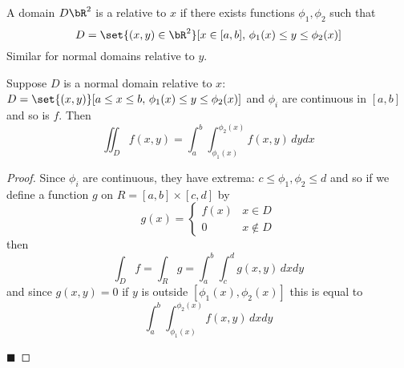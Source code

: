 \documentclass[10pt]{article}
\begin{document}
\begin{defn*}

    A domain $D\bR^2$ is a  relative to $x$ if there exists functions $\phi_1,\phi_2$ such that
    \[ D = \set{(x,y)\in\bR^2}[x\in[a,b],\, \phi_1(x)\leq y\leq\phi_2(x)] \]
    Similar for normal domains relative to $y$.

\end{defn*}

\begin{prop*}

    Suppose $D$ is a normal domain relative to $x$: $D=\set{(x,y)}[a\leq x\leq b,\, \phi_1(x)\leq y\leq\phi_2(x)]$ and $\phi_i$ are continuous in $[a,b]$ and so is $f$.
    Then
    \[ \iint_D f(x,y) = \int_a^b\int_{\phi_1(x)}^{\phi_2(x)}f(x,y)\,dydx \]

\end{prop*}

\begin{proof}

    Since $\phi_i$ are continuous, they have extrema: $c\leq\phi_1,\phi_2\leq d$ and so if we define a function $g$ on $R=[a,b]\times[c,d]$ by
    \[ g(x) = \begin{cases} f(x) & x\in D \\ 0 & x\notin D \end{cases} \]
    then
    \[ \int_D f = \int_R g = \int_a^b \int_c^d g(x,y)\,dxdy \]
    and since $g(x,y)=0$ if $y$ is outside $[\phi_1(x),\phi_2(x)]$ this is equal to
    \[ \int_a^b\int_{\phi_1(x)}^{\phi_2(x)}f(x,y)\,dxdy \]

    \hfill$\blacksquare$

\end{proof}
\end{document}
